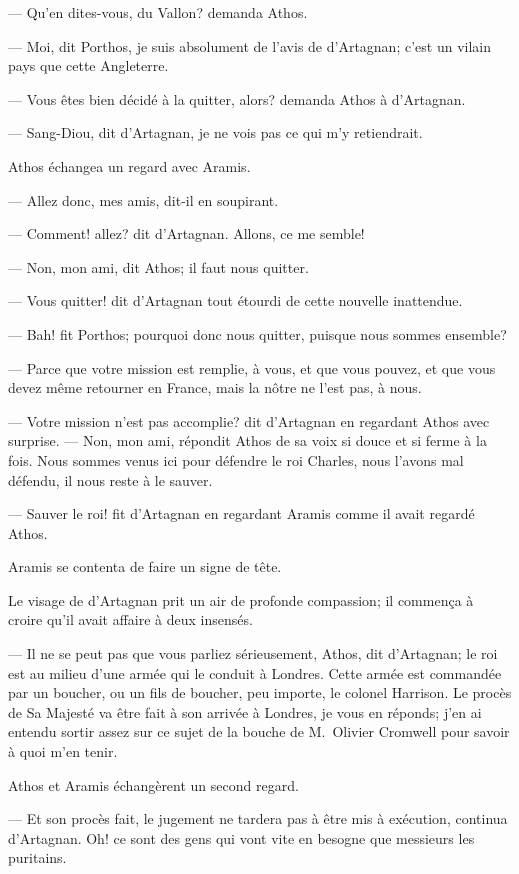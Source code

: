 — Qu'en dites-vous, du Vallon? demanda Athos.

— Moi, dit Porthos, je suis absolument de l'avis de d'Artagnan; c'est un vilain pays que cette Angleterre.

— Vous êtes bien décidé à la quitter, alors? demanda Athos à d'Artagnan.

— Sang-Diou, dit d'Artagnan, je ne vois pas ce qui m'y retiendrait.

Athos échangea un regard avec Aramis.

— Allez donc, mes amis, dit-il en soupirant.

— Comment! allez? dit d'Artagnan. Allons, ce me semble!

— Non, mon ami, dit Athos; il faut nous quitter.

— Vous quitter! dit d'Artagnan tout étourdi de cette nouvelle inattendue.

— Bah! fit Porthos; pourquoi donc nous quitter, puisque nous sommes ensemble?

— Parce que votre mission est remplie, à vous, et que vous pouvez, et que vous devez même retourner en France, mais la nôtre ne l'est pas, à nous.

— Votre mission n'est pas accomplie? dit d'Artagnan en regardant Athos avec surprise.
— Non, mon ami, répondit Athos de sa voix si douce et si ferme à la fois. Nous sommes venus ici pour défendre le roi Charles, nous l'avons mal défendu, il nous reste à le sauver.

— Sauver le roi! fit d'Artagnan en regardant Aramis comme il avait regardé Athos.

Aramis se contenta de faire un signe de tête.

Le visage de d'Artagnan prit un air de profonde compassion; il commença à croire qu'il avait affaire à deux insensés.

— Il ne se peut pas que vous parliez sérieusement, Athos, dit d'Artagnan; le roi est au milieu d'une armée qui le conduit à Londres. Cette armée est commandée par un boucher, ou un fils de boucher, peu importe, le colonel Harrison. Le procès de Sa Majesté va être fait à son arrivée à Londres, je vous en réponds; j'en ai entendu sortir assez sur ce sujet de la bouche de M.~Olivier Cromwell pour savoir à quoi m'en tenir.

Athos et Aramis échangèrent un second regard.

— Et son procès fait, le jugement ne tardera pas à être mis à exécution, continua d'Artagnan. Oh! ce sont des gens qui vont vite en besogne que messieurs les puritains.

